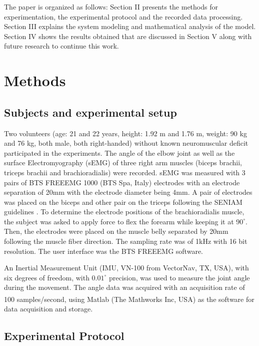 \documentclass[letterpaper, 10 pt, conference]{ieeeconf}  %
\begin{document}
The paper is organized as follows: Section II presents the methods for experimentation, the experimental protocol and the recorded data processing. Section III explains the system modeling and mathematical analysis of the model. Section IV shows the results obtained that are discussed in Section V along with future research to continue this work.

\section{Methods}
\subsection{Subjects and experimental setup}
Two volunteers (age: 21 and 22 years, height: 1.92 m and 1.76 m, weight: 90 kg and 76 kg, both male, both right-handed) without known neuromuscular deficit participated in the experiments. The angle of the elbow joint as well as the surface Electromyography (sEMG) of three right arm muscles (biceps brachii,  triceps brachii and brachioradialis) were recorded. 
sEMG was measured with 3 pairs of BTS FREEEMG 1000 (BTS Spa, Italy) electrodes with an electrode separation of 20mm with the electrode diameter being 4mm. A pair of electrodes was placed on the biceps and other pair on the triceps following the SENIAM guidelines \cite{SENIAM20170110}. To determine the electrode positions of the brachioradialis muscle, the subject was asked to apply force to flex the forearm while keeping it at \(90^{\circ}\). Then, the electrodes were placed on the muscle belly separated by 20mm following the muscle fiber direction. The sampling rate was of 1kHz with 16 bit resolution. The user interface was the BTS FREEEMG software.

An Inertial Measurement Unit (IMU, VN-100 from VectorNav, TX, USA), with six degrees of freedom, with \(0.01^{\circ}\) precision, was used to measure the joint angle during the movement. The angle data was acquired with an acquisition rate of 100 samples/second, using Matlab\textsuperscript{\textregistered} (The Mathworks Inc, USA) as the software for data acquisition and storage.


\subsection{Experimental Protocol}
\end{document}
